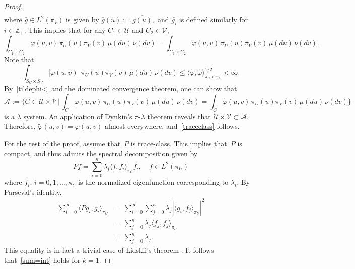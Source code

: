 \documentclass[11pt]{article}
\begin{document}
\begin{proof}
\[\begin{aligned}
		\end{aligned}
		\]
		where $\overline{g} \in L^2(\pi_V)$ is given by
                $\overline{g}(u) := \overline{g(u)},$ and
                $\overline{g_i}$ is defined
                similarly for $i \in \mathbb{Z}_+$. This implies that for any $C_1 \in
                \mathcal{U}$ and $C_2 \in \mathcal{V},$
		\[
		\int_{C_1 \times C_2} \varphi(u,v)\, \pi_U(u)\pi_V(v) \, \mu(du) \, \nu(dv) = \int_{C_1 \times C_2} \tilde{\varphi}(u,v)\, \pi_U(u)\pi_V(v) \, \mu(du) \, \nu(dv).
		\]
		Note that
		\begin{equation} \label{tildephi<}
		\int_{S_U \times S_V} |\tilde{\varphi}(u,v)| \, \pi_U(u)\pi_V(v) \, \mu(du) \, \nu(dv) \leq \langle \tilde{\varphi}, \tilde{\varphi} \rangle_{\pi_U \times \pi_V}^{1/2}< \infty.
		\end{equation}
		By~\eqref{tildephi<} and the dominated convergence
                theorem, one can show that
		\[
		\mathcal{A} := \Big\{ C\in\mathcal{U}\times\mathcal{V} \, \Big| \, \int_{C} \varphi(u,v)\, \pi_U(u)\pi_V(v) \, \mu(du) \, \nu(dv) = \int_{C} \tilde{\varphi}(u,v)\, \pi_U(u)\pi_V(v) \, \mu(du) \, \nu(dv) \Big\}
		\]
		is a $\lambda$ system. An application of Dynkin's
                $\pi$-$\lambda$ theorem reveals that
                $\mathcal{\mathcal{U}\times\mathcal{V}} \subset
                \mathcal{A}.$ Therefore, $\tilde{\varphi}(u,v) =
                \varphi(u,v)$ almost everywhere,
                and~\eqref{traceclass} follows.
		
		For the rest of the proof, assume that~$P$ is
                trace-class. This implies that~$P$ is compact, and
                thus admits the spectral decomposition \citep[see
                e.g.][\S 28 Corollary 2.1]{helmberg2014introduction}
                given by
		\begin{equation} \label{decompP}
		P f = \sum_{i=0}^{\kappa} \lambda_i \langle f, f_i \rangle_{\pi_U} f_i, \quad f \in L^2(\pi_U)
		\end{equation}
		where $f_i, \, i=0,1,\dots,\kappa,$ is the normalized eigenfunction corresponding to $\lambda_i.$ By Parseval's identity,
		\[
		\begin{aligned}
                  \sum_{i=0}^{\infty} \langle Pg_i, g_i \rangle_{\pi_U} &= \sum_{i=0}^{\infty} \sum_{j=0}^{\kappa} \lambda_j |\langle g_i, f_j \rangle_{\pi_U}|^2 \\
                  &= \sum_{j=0}^{\kappa} \lambda_j \langle f_j, f_j \rangle_{\pi_U} \\
                  &= \sum_{j=0}^{\kappa} \lambda_j.
		\end{aligned}
		\]
		This equality is in fact a trivial case of Lidskii's
                theorem \citep[see e.g.][]{erdos1974trace,
                  gohberg2012traces}. It follows that~\eqref{sum=int}
                holds for $k=1.$
		

\end{proof}
\end{document}
